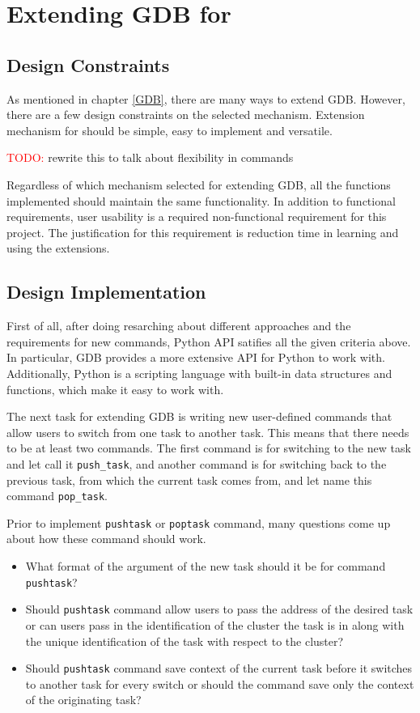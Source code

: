 \chapter{Extending GDB for \uCPP}
\section{Design Constraints}
As mentioned in chapter \ref{GDB}, there are many ways to extend GDB. However,
there are a few design constraints on the selected mechanism. Extension
mechanism for \uCPPS should be simple, easy to implement and versatile.

\textcolor{red}{TODO:} rewrite this to talk about flexibility in commands

Regardless of which mechanism selected for extending GDB, all the functions
implemented should maintain the same functionality. In addition to functional
requirements, user usability is a required non-functional requirement for this
project. The justification for this requirement is reduction time in
learning and using the extensions.

\section{Design Implementation}
First of all, after doing resarching about different approaches and the requirements for new
commands, Python API satifies all the given criteria above. In particular, GDB provides a more extensive API for Python to work with. Additionally, Python
is a scripting language with built-in data structures and functions, which make
it easy to work with.

The next task for extending GDB is writing new user-defined commands that allow
users to switch from one task to another task. This means that there needs to be at
least two commands. The first command is for switching to the new task and let
call it \verb|push_task|, and another command
is for switching back to the previous task, from which the current task comes
from, and let name this command \verb|pop_task|.

Prior to implement \verb|pushtask| or \verb|poptask| command, many questions come up about how
these command should work.
\begin{itemize}
\item What format of the argument of the new task should it be for command
\verb|pushtask|?
\item Should \verb|pushtask| command allow users to pass the address of the desired task or can users
pass in the identification of the cluster the task is in along with the unique
identification of the task with respect to the cluster?
\item Should \verb|pushtask| command save context of the current task before it switches to
another task for every switch or should the command save only the context of the
originating task?
\end{itemize}

